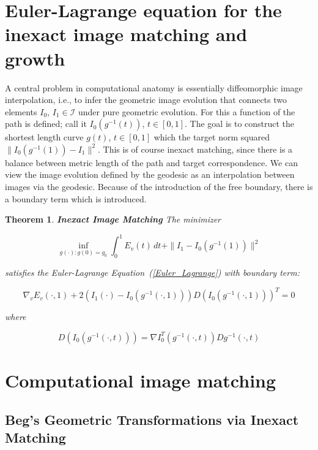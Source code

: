 \documentclass[final, paper=letter,5p,times,twocolumn]{elsarticle}
\newcommand{\CA}{computational anatomy}
\newtheorem{theorem}{Theorem} %
\theoremstyle{definition}
\begin{document}
\section{Euler-Lagrange equation for the inexact image matching and growth}

A central problem in \CA{} is essentially diffeomorphic image interpolation, i.e., to infer the geometric image evolution that connects two elements $I_{0}$, $I_{1} \in \mathcal{I}$ under pure geometric evolution. For this a function of the path is defined; call it $I_{0}(g^{-1}(t))$, $t \in [0, 1]$. The goal is to construct the shortest length curve $g(t)$, $t \in [0, 1]$ which  the target norm squared $\| I_{0} (g^{-1}(1)) - I_{1} \|^{2}$. This is of course inexact matching, since there is a balance between metric length of the path and target correspondence. We can view the image evolution defined by the geodesic as an interpolation between images via the geodesic. Because of the introduction of the free boundary, there is a boundary term which is introduced.

\begin{theorem}
  {\bf Inexact Image Matching} The minimizer

  $$
\underset{g(\cdot):  g(0) = g_{0}}{\inf} \int_{0}^{1} E_{v}(t) \, dt + \| I_{1} - I_{0}(g^{-1}(1))\|^{2}
$$

satisfies the Euler-Lagrange Equation~(\ref{Euler_Lagrange}) with boundary term:

$$
\nabla_{v}E_{v}(\cdot, 1) + 2(I_{1}(\cdot) - I_{0}(g^{-1}(\cdot, 1)))D(I_{0}(g^{-1}(\cdot, 1)))^{T} = 0
$$

where

$$
D(I_{0}(g^{-1}(\cdot,t))) = \nabla I_{0}^{T}(g^{-1}(\cdot, t))Dg^{-1}(\cdot, t)
$$
\end{theorem}






\section{Computational image matching}

\subsection{Beg's Geometric Transformations via Inexact Matching}
\end{document}

